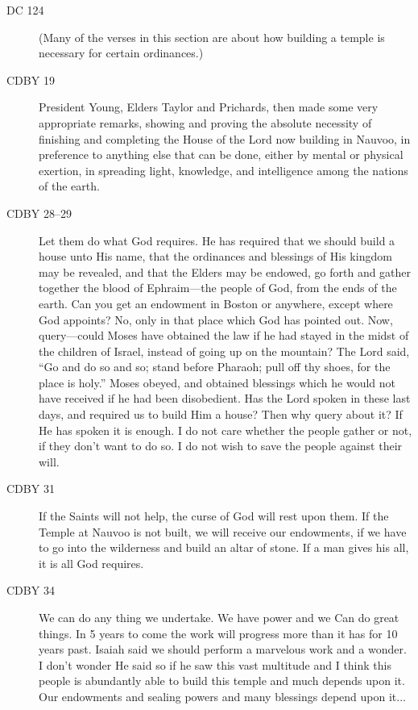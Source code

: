 			\begin{description}
			\item[DC 124] (Many of the verses in this section are about how building a temple is necessary for certain ordinances.)
			\item[CDBY 19] President Young, Elders Taylor and Prichards, then made some very appropriate remarks, showing and proving the absolute necessity of finishing and completing the House of the Lord now building in Nauvoo, in preference to anything else that can be done, either by mental or physical exertion, in spreading light, knowledge, and intelligence among the nations of the earth.
			\item[CDBY 28--29] Let them do what God requires. He has required that we should build a house unto His name, that the ordinances and blessings of His kingdom may be revealed, and that the Elders may be endowed, go forth and gather together the blood of Ephraim---the people of God, from the ends of the earth. Can you get an endowment in Boston or anywhere, except where God appoints? No, only in that place which God has pointed out. Now, query---could Moses have obtained the law if he had stayed in the midst of the children of Israel, instead of going up on the mountain? The Lord said, ``Go and do so and so; stand before Pharaoh; pull off thy shoes, for the place is holy.'' Moses obeyed, and obtained blessings which he would not have received if he had been disobedient. Has the Lord spoken in these last days, and required us to build Him a house? Then why query about it? If He has spoken it is enough. I do not care whether the people gather or not, if they don't want to do so. I do not wish to save the people against their will.
			\item[CDBY 31] If the Saints will not help, the curse of God will rest upon them. If the Temple at Nauvoo is not built, we will receive our endowments, if we have to go into the wilderness and build an altar of stone. If a man gives his all, it is all God requires.
			\item[CDBY 34] We can do any thing we undertake. We have power and we Can do great things. In 5 years to come the work will progress more than it has for 10 years past. Isaiah said we should perform a marvelous work and a wonder. I don't wonder He said so if he saw this vast multitude and I think this people is abundantly able to build this temple and much depends upon it. Our endowments and sealing powers and many blessings depend upon it...
			\end{description}

